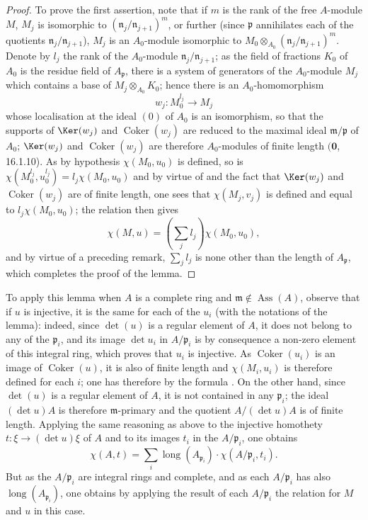 \begin{proof}
To prove the first assertion, note that if $m$ is the rank of the free $A$-module $M$, $M_j$ is isomorphic to $(\mathfrak{n}_j/\mathfrak{n}_{j+1})^m$, or further (since $\mathfrak{p}$ annihilates each of the quotients $\mathfrak{n}_j/\mathfrak{n}_{j+1}$), $M_j$ is an $A_0$-module isomorphic to $M_0\otimes_{A_0}(\mathfrak{n}_j/\mathfrak{n}_{j+1})^m$.
Denote by $l_j$ the rank of the $A_0$-module $\mathfrak{n}_j/\mathfrak{n}_{j+1}$;
as the field of fractions $K_0$ of $A_0$ is the residue field of $A_\mathfrak{p}$, there is a system of generators of the $A_0$-module $M_j$ which contains a base of $M_j\otimes_{A_0}K_0$; hence there is an $A_0$-homomorphism
\[
  w_j:M_0^{l_j}\to M_j
\]
whose localisation at the ideal $(0)$ of $A_0$ is an isomorphism, so that the supports of $\Ker(w_j)$ and $\operatorname{Coker}(w_j)$ are reduced to the maximal ideal $\mathfrak{m}/\mathfrak{p}$ of $A_0$; $\Ker(w_j)$ and $\operatorname{Coker}(w_j)$ are therefore $A_0$-modules of finite length $(\mathbf{0}$, 16.1.10).
As by hypothesis $\chi(M_0,u_0)$ is defined, so is $\chi(M_0^{l_j},u_0^{l_j})=l_j\chi(M_0,u_0)$ and by virtue of  and the fact that $\Ker(w_j)$ and $\operatorname{Coker}(w_j)$ are of finite length, one sees that $\chi(M_j,v_j)$ is defined and equal to $l_j\chi(M_0,u_0)$;
the relation  then gives
\[
  \chi(M,u)=\left(\sum_j l_j\right)\chi(M_0,u_0),
\]
and by virtue of a preceding remark, $\sum_j l_j$ is none other than the length of $A_\mathfrak{p}$, which completes the proof of the lemma.
\end{proof}

To apply this lemma when $A$ is a complete ring and $\mathfrak{m}\notin\operatorname{Ass}(A)$, observe that if $u$ is injective, it is the same for each of the $u_i$ (with the notations of the lemma):
indeed, since $\det(u)$ is a regular element of $A$, it does not belong to any of the $\mathfrak{p}_i$, and its image $\det u_i$ in $A/\mathfrak{p}_i$ is by consequence a non-zero element of this integral ring, which proves that $u_i$ is injective.
As $\operatorname{Coker}(u_i)$ is an image of $\operatorname{Coker}(u)$, it is also of finite length and $\chi(M_i,u_i)$ is therefore defined for each $i$;
one has therefore by the formula .
On the other hand, since $\det(u)$ is a regular element of $A$, it is not contained in any $\mathfrak{p}_i$;
the ideal $(\det u)A$ is therefore $\mathfrak{m}$-primary and the quotient $A/(\det u)A$ is of finite length.
Applying the same reasoning as above to the injective homothety $t:\xi\to(\det u)\xi$ of $A$ and to its images $t_i$ in the $A/\mathfrak{p}_i$, one obtains
\[
  \chi(A,t)=\sum_i\operatorname{long}(A_{\mathfrak{p}_i})\cdot\chi(A/\mathfrak{p}_i,t_i).
\]
But as the $A/\mathfrak{p}_i$ are integral rings and complete, and as each $A/\mathfrak{p}_i$ has also $\operatorname{long}(A_{\mathfrak{p}_i})$, one obtains by applying the result of each $A/\mathfrak{p}_i$ the relation  for $M$ and $u$ in this case.

